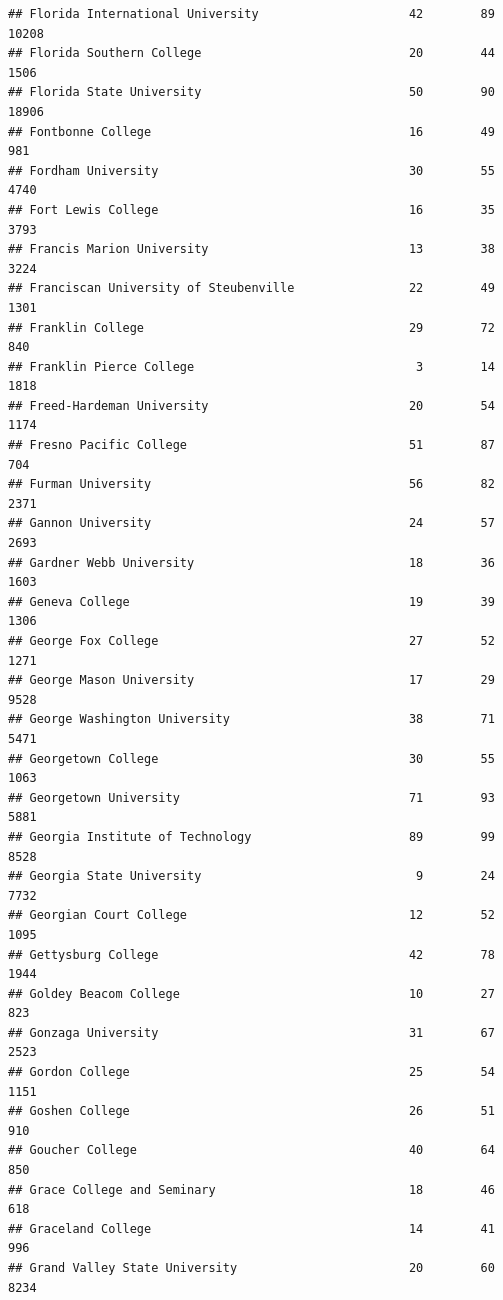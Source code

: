 \documentclass[
]{article}
\begin{document}
\begin{verbatim}
## Florida International University                     42        89       10208
## Florida Southern College                             20        44        1506
## Florida State University                             50        90       18906
## Fontbonne College                                    16        49         981
## Fordham University                                   30        55        4740
## Fort Lewis College                                   16        35        3793
## Francis Marion University                            13        38        3224
## Franciscan University of Steubenville                22        49        1301
## Franklin College                                     29        72         840
## Franklin Pierce College                               3        14        1818
## Freed-Hardeman University                            20        54        1174
## Fresno Pacific College                               51        87         704
## Furman University                                    56        82        2371
## Gannon University                                    24        57        2693
## Gardner Webb University                              18        36        1603
## Geneva College                                       19        39        1306
## George Fox College                                   27        52        1271
## George Mason University                              17        29        9528
## George Washington University                         38        71        5471
## Georgetown College                                   30        55        1063
## Georgetown University                                71        93        5881
## Georgia Institute of Technology                      89        99        8528
## Georgia State University                              9        24        7732
## Georgian Court College                               12        52        1095
## Gettysburg College                                   42        78        1944
## Goldey Beacom College                                10        27         823
## Gonzaga University                                   31        67        2523
## Gordon College                                       25        54        1151
## Goshen College                                       26        51         910
## Goucher College                                      40        64         850
## Grace College and Seminary                           18        46         618
## Graceland College                                    14        41         996
## Grand Valley State University                        20        60        8234

\end{verbatim}
\end{document}
